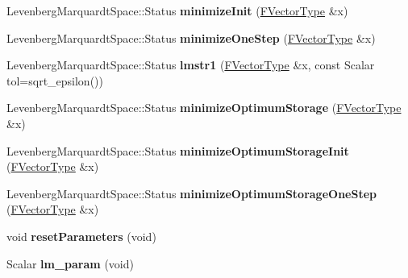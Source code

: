 \begin{DoxyCompactItemize}
Levenberg\+Marquardt\+Space\+::\+Status {\bfseries minimize\+Init} (\hyperlink{group___core___module}{F\+Vector\+Type} \&x)
\item 
\mbox{\label{class_eigen_1_1_levenberg_marquardt_a6a9a7e5a6c1acf2bcf3ada782454f31e}} 
Levenberg\+Marquardt\+Space\+::\+Status {\bfseries minimize\+One\+Step} (\hyperlink{group___core___module}{F\+Vector\+Type} \&x)
\item 
\mbox{\label{class_eigen_1_1_levenberg_marquardt_ae755e148a2572956906f12106a5e2de9}} 
Levenberg\+Marquardt\+Space\+::\+Status {\bfseries lmstr1} (\hyperlink{group___core___module}{F\+Vector\+Type} \&x, const Scalar tol=sqrt\+\_\+epsilon())
\item 
\mbox{\label{class_eigen_1_1_levenberg_marquardt_a8449edcd055e9ce9012633946bcdb2be}} 
Levenberg\+Marquardt\+Space\+::\+Status {\bfseries minimize\+Optimum\+Storage} (\hyperlink{group___core___module}{F\+Vector\+Type} \&x)
\item 
\mbox{\label{class_eigen_1_1_levenberg_marquardt_a4d69505761a14be40dfa1aacba6aab6b}} 
Levenberg\+Marquardt\+Space\+::\+Status {\bfseries minimize\+Optimum\+Storage\+Init} (\hyperlink{group___core___module}{F\+Vector\+Type} \&x)
\item 
\mbox{\label{class_eigen_1_1_levenberg_marquardt_aa25bbd21f50c532dc52018352c20bda4}} 
Levenberg\+Marquardt\+Space\+::\+Status {\bfseries minimize\+Optimum\+Storage\+One\+Step} (\hyperlink{group___core___module}{F\+Vector\+Type} \&x)
\item 
\mbox{\label{class_eigen_1_1_levenberg_marquardt_a722c2aee55299d786f79fd7316d6d2cb}} 
void {\bfseries reset\+Parameters} (void)
\item 
\mbox{\label{class_eigen_1_1_levenberg_marquardt_a8cb0d7b10c479262e643a9d2b83ce144}} 
Scalar {\bfseries lm\+\_\+param} (void)
\end{DoxyCompactItemize}
